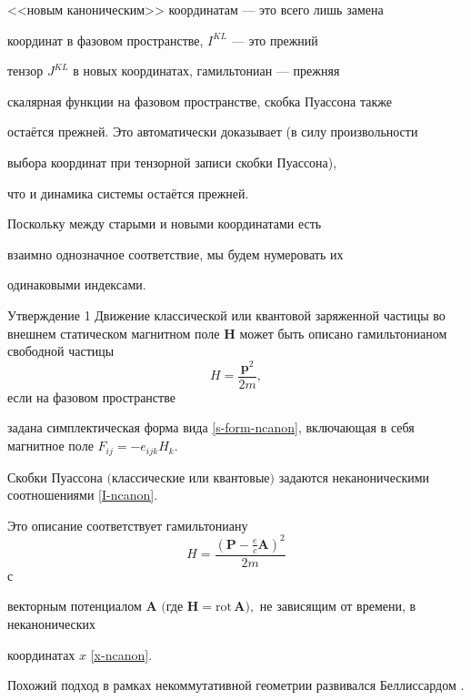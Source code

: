   <<новым каноническим>> координатам --- это всего лишь замена

  координат в фазовом пространстве, $I^{KL}$ --- это прежний

  тензор $J^{KL}$ в новых координатах, гамильтониан --- прежняя

  скалярная функции на фазовом пространстве, скобка Пуассона также

  остаётся прежней. Это автоматически доказывает (в силу произвольности

  выбора координат при тензорной записи скобки Пуассона),

  что и динамика системы остаётся прежней.



   Поскольку между старыми и новыми координатами есть

   взаимно однозначное соответствие, мы будем нумеровать их

   одинаковыми индексами.




\smallskip



\begin{newthm}{Утверждение 1} Движение классической или квантовой заряженной частицы во внешнем статическом магнитном поле $\mathbf{H}$ может быть описано гамильтонианом свободной частицы $$H=\frac{\mathbf{p}^2}{2m},$$ если на фазовом пространстве

задана симплектическая форма вида \eqref{s-form-ncanon}{\rm ,} включающая в себя магнитное поле $F_{ij}=-e_{ijk}H_k.$

Скобки Пуассона $($классические или квантовые$)$ задаются неканоническими соотношениями \eqref{I-ncanon}{\rm .}

Это описание соответствует гамильтониану $$H=\frac{(\mathbf{P}-\frac{e}{c}\mathbf{A})^2}{2m}$$ с

векторным потенциалом $\mathbf{A}$ $($где $\mathbf{H}=\mathrm{rot}\,\mathbf{A}),$ не зависящим от времени{\rm ,} в неканонических

координатах $x$ \eqref{x-ncanon}{\rm .}

\end{newthm}



\smallskip



Похожий подход в рамках некоммутативной геометрии развивался Беллиссардом \cite{ivanovmg:bib:bellissard}.

